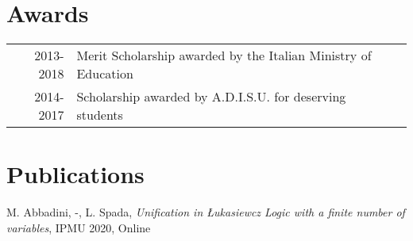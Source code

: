 \documentclass[letterpaper]{deedy-resume} %
\begin{document}
\begin{minipage}[t]{0.66\textwidth}


\section{Awards} 

\begin{tabular}{rll}
2013-2018 & Merit Scholarship awarded by the Italian Ministry of Education\\
2014-2017 & Scholarship awarded by A.D.I.S.U. for deserving students
\end{tabular}

\sectionspace %


\section{Publications} 
\begin{tightitemize}
\item M. Abbadini, -, L. Spada, \emph{Unification in {\L}ukasiewcz Logic with a finite number of variables}, IPMU 2020, Online
\end{tightitemize}
\sectionspace %


\end{minipage} %


\newpage %
\end{document}
